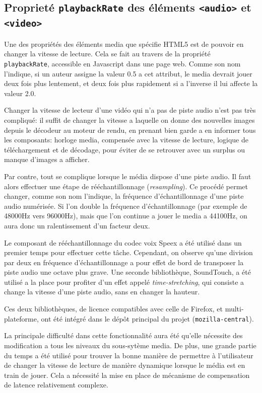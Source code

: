 \documentclass[a4paper,10pt]{article}
\newcommand{\cc}[1]{\texttt{#1}}
\begin{document}
\begin{multicols}{2}
  \section{Proprieté \cc{playbackRate} des éléments \cc{<audio>} et \cc{<video>}}
  Une des propriétés des éléments media que spécifie HTML5 est de pouvoir en
  changer la vitesse de lecture. Cela se fait au travers de la propriété
  \cc{playbackRate}, accessible en Javascript dans une page web. Comme son nom
  l'indique, si un auteur assigne la valeur 0.5 a cet attribut, le media devrait
  jouer deux fois plus lentement, et deux fois plus rapidement si a l'inverse il
  lui affecte la valeur 2.0.

  Changer la vitesse de lecteur d'une vidéo qui n'a pas de piste audio n'est pas
  très compliqué: il suffit de changer la vitesse a laquelle on donne des
  nouvelles images depuis le décodeur au moteur de rendu, en prenant bien garde
  a en informer tous les composants: horloge media, compensée avec la vitesse de
  lecture, logique de téléchargement et de décodage, pour éviter de se retrouver
  avec un surplus ou manque d'images a afficher.

  Par contre, tout se complique lorsque le média dispose d'une piste audio. Il
  faut alors effectuer une étape de rééchantillonnage (\emph{resampling}). Ce
  procédé permet changer, comme son nom l'indique, la fréquence
  d'échantillonnage d'une piste audio numérisée. Si l'on double la fréquence
  d'échantillonnage (par exemple de 48000Hz vers 96000Hz), mais que l'on continue
  a jouer le media a 44100Hz, on aura donc un ralentissement d'un facteur deux.

  Le composant de rééchantillonnage du codec voix Speex a été utilisé dans un
  premier temps pour effectuer cette tâche. Cependant, on observe qu'une
  division par deux en fréquence d'échantillonnage a pour effet de bord de
  transposer la piste audio une octave plus grave. Une seconde bibliothèque,
  SoundTouch, a été utilisé a la place pour profiter d'un effet appelé
  \emph{time-stretching}, qui consiste a change la vitesse d'une piste audio,
  sans en changer la hauteur.

  Ces deux bibliothèques, de licence compatibles avec celle de Firefox, et
  multi-plateforme, ont été intégré dans le dépôt principal du projet
  (\cc{mozilla-central}).

  La principale difficulté dans cette fonctionnalité aura été qu'elle nécessite
  des modification a tous les niveaux du sous-sytème media. De plus, une grande
  partie du temps a été utilisé pour trouver la bonne manière de permettre à
  l'utilisateur de changer la vitesse de lecture de manière dynamique lorsque le
  média est en train de jouer. Cela a nécessité la mise en place de mécanisme de
  compensation de latence relativement complexe.


\end{multicols}
\end{document}
